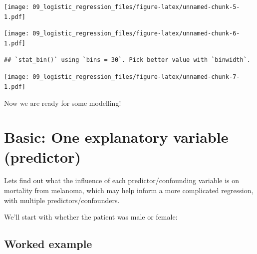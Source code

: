 \documentclass[12pt,]{krantz}
\makeatletter
\newenvironment{Shaded}{\begin{snugshade}}{\end{snugshade}}
\newcommand{\DataTypeTok}[1]{\textcolor[rgb]{0.13,0.29,0.53}{#1}}
\newcommand{\KeywordTok}[1]{\textcolor[rgb]{0.13,0.29,0.53}{\textbf{#1}}}
\newcommand{\NormalTok}[1]{#1}
\newcommand{\OperatorTok}[1]{\textcolor[rgb]{0.81,0.36,0.00}{\textbf{#1}}}
\newcommand{\StringTok}[1]{\textcolor[rgb]{0.31,0.60,0.02}{#1}}
\newenvironment{kframe}{%
\medskip{}
\setlength{\fboxsep}{.8em}
 \def\at@end@of@kframe{}%
 \ifinner\ifhmode%
  \def\at@end@of@kframe{\end{minipage}}%
  \begin{minipage}{\columnwidth}%
 \fi\fi%
 \def\FrameCommand##1{\hskip\@totalleftmargin \hskip-\fboxsep
 \colorbox{shadecolor}{##1}\hskip-\fboxsep
     \hskip-\linewidth \hskip-\@totalleftmargin \hskip\columnwidth}%
 \MakeFramed {\advance\hsize-\width
   \@totalleftmargin\z@ \linewidth\hsize
   \@setminipage}}%
 {\par\unskip\endMakeFramed%
 \at@end@of@kframe}
\renewenvironment{Shaded}{\begin{kframe}}{\end{kframe}}
\theoremstyle{definition}
\theoremstyle{definition}
\theoremstyle{definition}
\theoremstyle{remark}
\makeatother
\begin{document}
\texttt{[image: 09\_logistic\_regression\_files/figure-latex/unnamed-chunk-5-1.pdf]}

\begin{Shaded}
\end{Shaded}

\texttt{[image: 09\_logistic\_regression\_files/figure-latex/unnamed-chunk-6-1.pdf]}

\begin{Shaded}
\end{Shaded}

\begin{verbatim}
## `stat_bin()` using `bins = 30`. Pick better value with `binwidth`.
\end{verbatim}

\texttt{[image: 09\_logistic\_regression\_files/figure-latex/unnamed-chunk-7-1.pdf]}

Now we are ready for some modelling!

\hypertarget{basic-one-explanatory-variable-predictor}{%
\section{Basic: One explanatory variable
(predictor)}\label{basic-one-explanatory-variable-predictor}}

Lets find out what the influence of each predictor/confounding variable
is on mortality from melanoma, which may help inform a more complicated
regression, with multiple predictors/confounders.

We'll start with whether the patient was male or female:

\hypertarget{worked-example-1}{%
\subsection{Worked example}\label{worked-example-1}}
\end{document}
